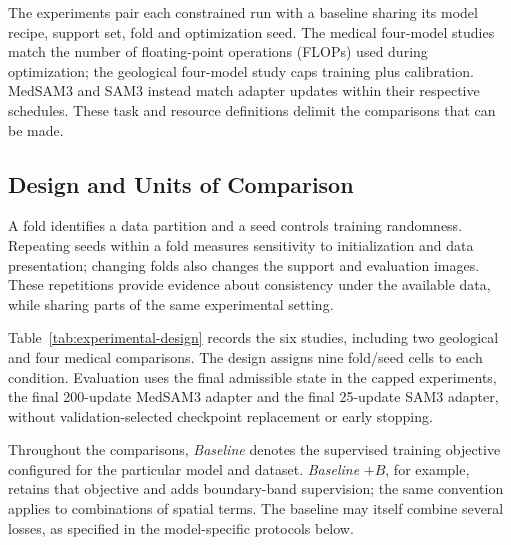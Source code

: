 \documentclass[12pt,a4paper]{article}
\begin{document}
The experiments pair each constrained run with a baseline sharing its
model recipe, support set, fold and optimization seed. The medical
four-model studies match the number of floating-point operations (FLOPs)
used during optimization; the geological four-model
study caps training plus calibration. MedSAM3 and SAM3 instead match
adapter updates within their respective schedules. These task and
resource definitions delimit the comparisons that can be made.

\subsection{Design and Units of Comparison}
\label{sec:experimental-structure}

A fold identifies a data partition and a seed controls training
randomness. Repeating seeds within a fold measures sensitivity to
initialization and data presentation; changing folds also changes the
support and evaluation images. These repetitions provide evidence about
consistency under the available data, while sharing parts of the same
experimental setting.

Table~\ref{tab:experimental-design} records the six studies, including
two geological and four medical comparisons. The design assigns nine fold/seed cells
to each condition. Evaluation uses the final admissible state in the
capped experiments, the final 200-update MedSAM3 adapter and the final
25-update SAM3 adapter, without validation-selected checkpoint
replacement or early stopping.

Throughout the comparisons, \emph{Baseline} denotes the supervised
training objective configured for the particular model and dataset.
\emph{Baseline} $+B$, for example, retains that objective and adds
boundary-band supervision; the same convention applies to combinations
of spatial terms. The baseline may itself combine several losses, as
specified in the model-specific protocols below.
\end{document}
